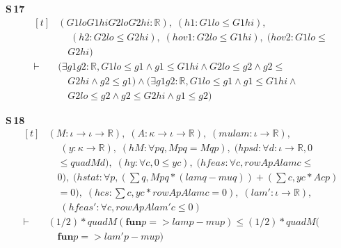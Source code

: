 \noindent\textbf{S\,17}\quad{}
{\footnotesize\[ \begin{aligned}[t]
&(\mathit{G1lo} \mathit{G1hi} \mathit{G2lo} \mathit{G2hi} : \mathbb{R} ),\; (\mathit{h1} : \mathit{G1lo} \leq \mathit{G1hi}),\\
&\quad \; (\mathit{h2} : \mathit{G2lo} \leq \mathit{G2hi}),\; (\mathit{hov1} : \mathit{G2lo} \leq \mathit{G1hi}),\; (\mathit{hov2} : \mathit{G1lo} \leq\\
&\quad \mathit{G2hi})\\
\vdash\;&(\exists \mathit{g1} \mathit{g2} : \mathbb{R} , \mathit{G1lo} \leq \mathit{g1} \wedge \mathit{g1} \leq \mathit{G1hi} \wedge \mathit{G2lo} \leq \mathit{g2} \wedge \mathit{g2} \leq\\
&\quad \mathit{G2hi} \wedge \mathit{g2} \leq \mathit{g1}) \wedge (\exists \mathit{g1} \mathit{g2} : \mathbb{R} , \mathit{G1lo} \leq \mathit{g1} \wedge \mathit{g1} \leq \mathit{G1hi} \wedge\\
&\quad \mathit{G2lo} \leq \mathit{g2} \wedge \mathit{g2} \leq \mathit{G2hi} \wedge \mathit{g1} \leq \mathit{g2})
\end{aligned} \]}

\noindent\textbf{S\,18}\quad{}
{\footnotesize\[ \begin{aligned}[t]
&(\mathit{M} : \iota \to \iota \to \mathbb{R} ),\; (\mathit{A} : \kappa \to \iota \to \mathbb{R} ),\; (\mathit{mu} \mathit{lam} : \iota \to \mathbb{R} ),\\
&\quad \; (\mathit{y} : \kappa \to \mathbb{R} ),\; (\mathit{hM} : \forall \mathit{p} \mathit{q}, \mathit{M} \mathit{p} \mathit{q} = \mathit{M} \mathit{q} \mathit{p}),\; (\mathit{hpsd} : \forall \mathit{d} : \iota \to \mathbb{R} , 0\\
&\quad \leq \mathit{quad} \mathit{M} \mathit{d}),\; (\mathit{hy} : \forall \mathit{c}, 0 \leq \mathit{y} \mathit{c}),\; (\mathit{hfeas} : \forall \mathit{c}, \mathit{rowAp} \mathit{A} \mathit{lam} \mathit{c} \leq\\
&\quad 0),\; (\mathit{hstat} : \forall \mathit{p}, (\textstyle\sum \mathit{q}, \mathit{M} \mathit{p} \mathit{q} * (\mathit{lam} \mathit{q} - \mathit{mu} \mathit{q})) + (\textstyle\sum \mathit{c}, \mathit{y} \mathit{c} * \mathit{A} \mathit{c} \mathit{p})\\
&\quad = 0),\; (\mathit{hcs} : \textstyle\sum \mathit{c}, \mathit{y} \mathit{c} * \mathit{rowAp} \mathit{A} \mathit{lam} \mathit{c} = 0),\; (\mathit{lam'} : \iota \to \mathbb{R} ),\\
&\quad \; (\mathit{hfeas'} : \forall \mathit{c}, \mathit{rowAp} \mathit{A} \mathit{lam'} \mathit{c} \leq 0)\\
\vdash\;&(1/2) * \mathit{quad} \mathit{M} (\mathbf{fun} \mathit{p} => \mathit{lam} \mathit{p} - \mathit{mu} \mathit{p}) \leq (1/2) * \mathit{quad} \mathit{M} (\\
&\quad \mathbf{fun} \mathit{p} => \mathit{lam'} \mathit{p} - \mathit{mu} \mathit{p})
\end{aligned} \]}

